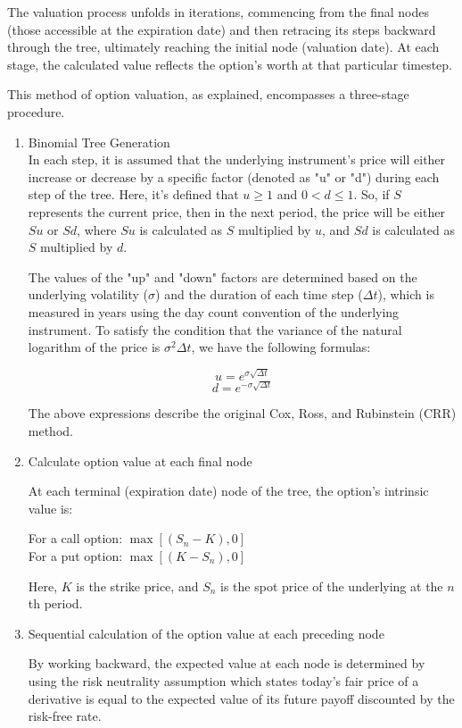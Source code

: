 \documentclass{article}
\begin{document}
The valuation process unfolds in iterations, commencing from the final nodes (those accessible at the expiration date) and then retracing its steps backward through the tree, ultimately reaching the initial node (valuation date). At each stage, the calculated value reflects the option's worth at that particular timestep.

This method of option valuation, as explained, encompasses a three-stage procedure.
\begin{enumerate}
    \item Binomial Tree Generation \\
    In each step, it is assumed that the underlying instrument's price will either increase or decrease by a specific factor (denoted as "u" or "d") during each step of the tree. Here, it's defined that $u \geq 1$ and $0 < d \leq 1$. So, if $S$ represents the current price, then in the next period, the price will be either $Su$ or $Sd$, where $Su$ is calculated as $S$ multiplied by $u$, and $Sd$ is calculated as $S$ multiplied by $d$.
    
    The values of the "up" and "down" factors are determined based on the underlying volatility ($\sigma$) and the duration of each time step ($\Delta t$), which is measured in years using the day count convention of the underlying instrument. To satisfy the condition that the variance of the natural logarithm of the price is $\sigma^2 \Delta t$, we have the following formulas:
    
    $$u = e^{\sigma \sqrt{\Delta t}}$$
    $$d = e^{-\sigma \sqrt{\Delta t}}$$
    
    The above expressions describe the original Cox, Ross, and Rubinstein (CRR) method. \cite{Cox1979Sep}
    
    
    \item Calculate option value at each final node

    At each terminal (expiration date) node of the tree, the option's intrinsic value is:
    
    For a call option: $\max\left[(S_n - K), 0\right]$ \\
    For a put option: $\max\left[(K - S_n), 0\right]$
    
    Here, $K$ is the strike price, and $S_n$ is the spot price of the underlying at the $n$th period.

    \item Sequential calculation of the option value at each preceding node

    By working backward, the expected value at each node is determined by using the risk neutrality assumption which states today's fair price of a derivative is equal to the expected value of its future payoff discounted by the risk-free rate. 


\end{enumerate}
\end{document}

